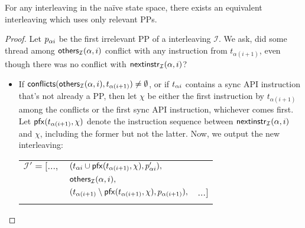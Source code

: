 \begin{lemma}
	For any interleaving in the na\"{i}ve state space, there exists an equivalent interleaving which uses only relevant PPs.
	\label{lem:equivalent}
\end{lemma}

\begin{proof}
	Let $p_{\alpha{}i}$ be the first irrelevant PP of a \naive interleaving $\mathcal{I}$.
	We ask, did some thread among $\mathsf{others}_{\mathcal{I}}(\alpha,i)$ conflict with any instruction from $t_{\alpha{}(i+1)}$, even though there was no conflict with $\mathsf{nextinstr}_{\mathcal{I}}(\alpha,i)$?
	\begin{itemize}
		\item If $\mathsf{conflicts}(\mathsf{others}_{\mathcal{I}}(\alpha,i),t_{\alpha{}(i+1)}) \ne \emptyset$, or if $t_{\alpha{}i}$ contains a sync API instruction that's not already a PP,
			then let $\chi$ be either the first instruction by $t_{\alpha{}(i+1)}$ among the conflicts or the first sync API instruction, whichever comes first.
			Let $\mathsf{pfx}(t_{\alpha{}(i+1)},\chi)$ denote the instruction sequence between $\mathsf{nextinstr}_{\mathcal{I}}(\alpha,i)$ and $\chi$, including the former but not the latter.
			Now, we output the new interleaving:

			\begin{tabular}{lll}
				\\
				$\mathcal{I}' = [...,$&$(t_{\alpha{}i} \cup \mathsf{pfx}(t_{\alpha{}(i+1)},\chi), p_{\alpha{}i}'),$& \\
																		 &$\mathsf{others}_{\mathcal{I}}(\alpha,i),$& \\
						       &$(t_{\alpha{}(i+1)} \setminus \mathsf{pfx}(t_{\alpha{}(i+1)},\chi), p_{\alpha{}(i+1)}),$ & $ ...]$ \\
				\\
			\end{tabular}


\end{itemize}
\end{proof}
